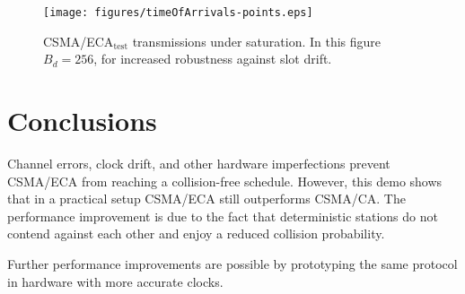 \documentclass[conference]{IEEEtran}
\begin{document}



	\begin{figure}[htbp]
		\centering
		\texttt{[image: figures/timeOfArrivals-points.eps]}
		\caption{CSMA/ECA$_{\text{test}}$ transmissions under saturation. In this figure $B_{d}=256$, for increased robustness against slot drift.}
		\label{fig:ECA-test}
	\end{figure}

\section{Conclusions}
Channel errors, clock drift, and other hardware imperfections prevent CSMA/ECA from reaching a collision-free schedule. However, this demo shows that in a practical setup CSMA/ECA still outperforms CSMA/CA. The performance improvement is due to the fact that deterministic stations do not contend against each other and enjoy a reduced collision probability.

Further performance improvements are possible by prototyping the same protocol in hardware with more accurate clocks.




\end{document}
